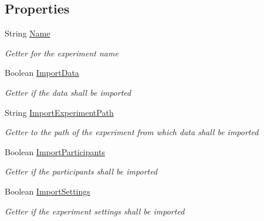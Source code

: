 \subsection*{Properties}
\begin{DoxyCompactItemize}
\item 
String \hyperlink{class_web_analyzer_1_1_events_1_1_create_experiment_event_a6e6e3eee6e63143be6e5ab7b329533c6}{Name}
\begin{DoxyCompactList}\small\item\em Getter for the experiment name \end{DoxyCompactList}\item 
Boolean \hyperlink{class_web_analyzer_1_1_events_1_1_create_experiment_event_a23ca6eb22cf95423be8b35c4b200da90}{Import\+Data}
\begin{DoxyCompactList}\small\item\em Getter if the data shall be imported \end{DoxyCompactList}\item 
String \hyperlink{class_web_analyzer_1_1_events_1_1_create_experiment_event_a9b9c24f0a0c60406c0f83ffbeefead50}{Import\+Experiment\+Path}
\begin{DoxyCompactList}\small\item\em Getter to the path of the experiment from which data shall be imported \end{DoxyCompactList}\item 
Boolean \hyperlink{class_web_analyzer_1_1_events_1_1_create_experiment_event_ac0f034fcfe34ab152d713b42e83c3125}{Import\+Participants}
\begin{DoxyCompactList}\small\item\em Getter if the participants shall be imported \end{DoxyCompactList}\item 
Boolean \hyperlink{class_web_analyzer_1_1_events_1_1_create_experiment_event_ad7acdf21b15a8eb496b29b2ee4cd5d35}{Import\+Settings}
\begin{DoxyCompactList}\small\item\em Getter if the experiment settings shall be imported \end{DoxyCompactList}\end{DoxyCompactItemize}

